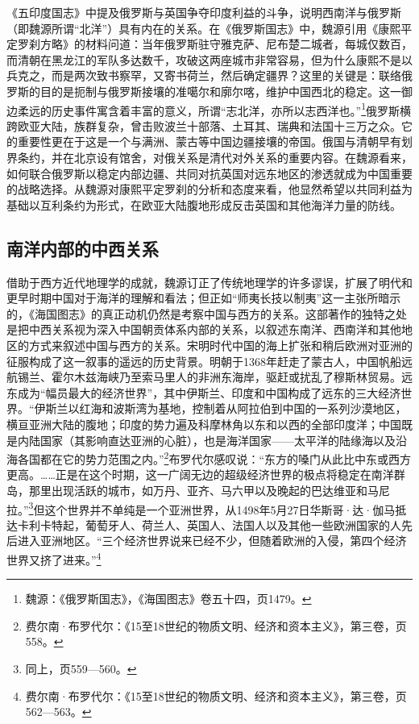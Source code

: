 \documentclass[a4paper, 12pt, openright]{ctexbook}
\begin{document}
《五印度国志》中提及俄罗斯与英国争夺印度利益的斗争，说明西南洋与俄罗斯（即魏源所谓“北洋”）具有内在的关系。在《俄罗斯国志》中，魏源引用《康熙平定罗刹方略》的材料问道：当年俄罗斯驻守雅克萨、尼布楚二城者，每城仅数百，而清朝在黑龙江的军队多达数千，攻破这两座城市非常容易，但为什么康熙不是以兵克之，而是两次致书察罕，又寄书荷兰，然后确定疆界？这里的关键是：联络俄罗斯的目的是扼制与俄罗斯接壤的准噶尔和廓尔喀，维护中国西北的稳定。这一御边柔远的历史事件寓含着丰富的意义，所谓“志北洋，亦所以志西洋也。”\footnote{魏源：《俄罗斯国志》，《海国图志》卷五十四，页1479。}俄罗斯横跨欧亚大陆，族群复杂，曾击败波兰十部落、土耳其、瑞典和法国十三万之众。它的重要性更在于这是一个与满洲、蒙古等中国边疆接壤的帝国。俄国与清朝早有划界条约，并在北京设有馆舍，对俄关系是清代对外关系的重要内容。在魏源看来，如何联合俄罗斯以稳定内部边疆、共同对抗英国对远东地区的渗透就成为中国重要的战略选择。从魏源对康熙平定罗刹的分析和态度来看，他显然希望以共同利益为基础以互利条约为形式，在欧亚大陆腹地形成反击英国和其他海洋力量的防线。

\subsection{南洋内部的中西关系}

借助于西方近代地理学的成就，魏源订正了传统地理学的许多谬误，扩展了明代和更早时期中国对于海洋的理解和看法；但正如“师夷长技以制夷”这一主张所暗示的，《海国图志》的真正动机仍然是考察中国与西方的关系。这部著作的独特之处是把中西关系视为深入中国朝贡体系内部的关系，以叙述东南洋、西南洋和其他地区的方式来叙述中国与西方的关系。宋明时代中国的海上扩张和稍后欧洲对亚洲的征服构成了这一叙事的遥远的历史背景。明朝于1368年赶走了蒙古人，中国帆船远航锡兰、霍尔木兹海峡乃至索马里人的非洲东海岸，驱赶或扰乱了穆斯林贸易。远东成为“幅员最大的经济世界”，其中伊斯兰、印度和中国构成了远东的三大经济世界。“伊斯兰以红海和波斯湾为基地，控制着从阿拉伯到中国的一系列沙漠地区，横亘亚洲大陆的腹地；印度的势力遍及科摩林角以东和以西的全部印度洋；中国既是内陆国家（其影响直达亚洲的心脏），也是海洋国家——太平洋的陆缘海以及沿海各国都在它的势力范围之内。”\footnote{费尔南·布罗代尔：《15至18世纪的物质文明、经济和资本主义》，第三卷，页558。}布罗代尔感叹说：“东方的嗓门从此比中东或西方更高。……正是在这个时期，这一广阔无边的超级经济世界的极点将稳定在南洋群岛，那里出现活跃的城市，如万丹、亚齐、马六甲以及晚起的巴达维亚和马尼拉。”\footnote{同上，页559—560。}但这个世界并不单纯是一个亚洲世界，从1498年5月27日华斯哥·达·伽马抵达卡利卡特起，葡萄牙人、荷兰人、英国人、法国人以及其他一些欧洲国家的人先后进入亚洲地区。“三个经济世界说来已经不少，但随着欧洲的入侵，第四个经济世界又挤了进来。”\footnote{费尔南·布罗代尔：《15至18世纪的物质文明、经济和资本主义》，第三卷，页562—563。}
\end{document}
